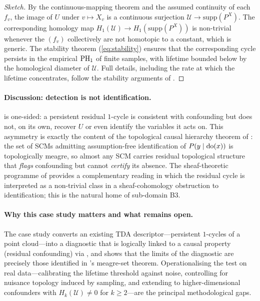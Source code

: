 \begin{proof}[Sketch]
By the continuous-mapping theorem and the assumed continuity of each
$f_v$, the image of $U$ under $v \mapsto X_v$ is a continuous
surjection $\mathcal{U} \to \mathrm{supp}(P^{X})$. The corresponding
homology map $H_1(\mathcal{U}) \to H_1(\mathrm{supp}(P^X))$ is
non-trivial whenever the $(f_v)$ collectively are not homotopic to a
constant, which is generic. The stability theorem
(\cref{eq:stability}) ensures that the corresponding cycle persists in
the empirical $\mathrm{PH}_{1}$ of finite samples, with lifetime bounded below
by the homological diameter of $\mathcal{U}$. Full details, including
the rate at which the lifetime concentrates, follow the stability
arguments of \citet{cohen2007stability,chazal2016structure}.
\end{proof}

\paragraph{Discussion: detection is not identification.}
 is one-sided: a persistent residual
$1$-cycle is consistent with confounding but does not, on its own,
recover $U$ or even identify the variables it acts on. This asymmetry
is exactly the content of the topological causal hierarchy theorem of
\citet{ibeling2021topological}: the set of SCMs admitting
assumption-free identification of $P(y\mid \mathrm{do}(x))$ is topologically
meagre, so almost any SCM carries residual topological structure that
\emph{flags} confounding but cannot \emph{certify} its absence. The
sheaf-theoretic programme of \citet{mahadevan2021causal,
mahadevan2022universal,mahadevan2025sheaf} provides a complementary
reading in which the residual cycle is interpreted as a non-trivial
class in a sheaf-cohomology obstruction to identification; this is
the natural home of sub-domain B3.

\paragraph{Why this case study matters and what remains open.}
The case study converts an existing TDA descriptor---persistent
$1$-cycles of a point cloud---into a diagnostic that is logically
linked to a causal property (residual confounding) via
, and shows that the limits of the
diagnostic are precisely those identified in
\citet{ibeling2021topological}'s meagre-set theorem. Operationalising
the test on real data---calibrating the lifetime threshold against
noise, controlling for nuisance topology induced by sampling, and
extending to higher-dimensional confounders with $H_k(\mathcal{U}) \neq 0$
for $k \ge 2$---are the principal methodological gaps.


